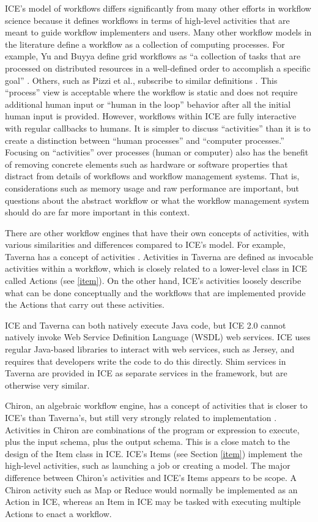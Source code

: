 ICE's model of workflows differs significantly from many other
efforts in workflow science because it defines workflows in terms of high-level activities that are meant to guide workflow implementers and users. Many other workflow models in the literature define a workflow as
a collection of computing processes. For example, Yu and Buyya define
grid workflows as ``a collection of tasks that are processed on
distributed resources in a well-defined order to accomplish a specific
goal'' \cite{yu_taxonomy_2005}. Others, such as Pizzi et al., subscribe to
similar definitions \cite{pizzi_aiida:_2016}. This ``process'' view is
acceptable where the workflow is static and does not require additional
human input or ``human in the loop'' behavior after all the initial
human input is provided. However, workflows within ICE are fully interactive with regular callbacks to humans. It is simpler to discuss ``activities'' than it is to create a distinction between ``human processes'' and ``computer processes.''
Focusing on ``activities'' over processes (human or computer) also has
the benefit of removing concrete elements such as hardware or software properties that distract from details of workflows and workflow 
management systems. That is, considerations such as memory usage and 
raw performance are important, but questions about the abstract workflow 
or what the workflow management system should do are far more important in this context.

There are other workflow engines that have their own concepts of activities, with various similarities and differences compared to ICE's model. For example, Taverna has a concept of activities \cite{wolstencroft_taverna_2013}. Activities in Taverna are defined as invocable activities within a workflow, which is closely related to a lower-level class in ICE called Actions (see \ref{item}). On the other hand, ICE's activities loosely describe what can be done conceptually and the workflows that are implemented provide the Actions that carry out these activities. 

ICE and Taverna can both natively execute Java code, but ICE 2.0 cannot natively invoke Web Service Definition Language (WSDL) web services. ICE uses regular Java-based libraries to interact with web services, such as Jersey, and requires that developers write the code to do this directly. Shim services in Taverna are provided in ICE as separate services in the framework, but are otherwise very similar.

Chiron, an algebraic workflow engine, has a concept of activities that is closer to ICE's than Taverna's, but still very strongly related to implementation \cite{ogasawara_chiron_2014}. Activities in Chiron are combinations of the program or expression to execute, plus the input schema, plus the output schema. This is a close match to the design of the Item class in ICE. ICE's Items (see Section \ref{item}) implement the high-level activities, such as launching a job or creating a model. The major difference between Chiron's activities and ICE's Items appears to be scope. A Chiron activity such as Map or Reduce would normally be implemented as an Action in ICE, whereas an Item in ICE may be tasked with executing multiple Actions to enact a workflow.

